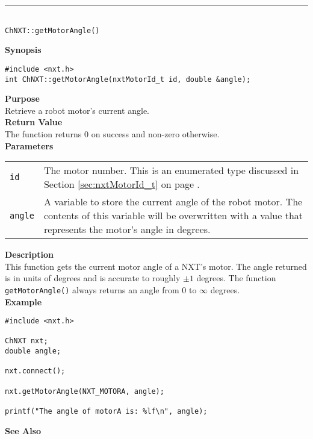 \noindent
\vspace{5pt}
\rule{4.5in}{0.015in}\\
\noindent
{\LARGE \texttt{ChNXT::getMotorAngle()}}\\
{}

\noindent
{\bf Synopsis}
\begin{lstlisting}
#include <nxt.h>
int ChNXT::getMotorAngle(nxtMotorId_t id, double &angle);
\end{lstlisting}

\noindent
{\bf Purpose}\\
Retrieve a robot motor's current angle.\\

\noindent
{\bf Return Value}\\
The function returns 0 on success and non-zero otherwise.\\

\noindent
{\bf Parameters}\\
\vspace{-0.1in}
\begin{description}
\item               
\begin{tabular}{p{15 mm}p{145 mm}}
\texttt{id} & The motor number. This is an enumerated type 
discussed in Section \ref{sec:nxtMotorId_t} on page
\pageref{sec:nxtMotorId_t}.\\
\texttt{angle} & A variable to store the current angle of the robot
motor. The contents of this variable will be overwritten with a value that
represents the motor's angle in degrees.  \\
\end{tabular}
\end{description}

\noindent
{\bf Description}\\
This function gets the current motor angle of a NXT's motor. The
angle returned is in units of degrees and is accurate to roughly $\pm1$
degrees. The function \texttt{getMotorAngle()} always returns an angle 
from 0 to $\infty$ degrees.\\

\noindent
{\bf Example}
\begin{lstlisting}
#include <nxt.h>

ChNXT nxt;
double angle;

nxt.connect();

nxt.getMotorAngle(NXT_MOTORA, angle);

printf("The angle of motorA is: %lf\n", angle);
\end{lstlisting}

\noindent
{\bf See Also}\\

